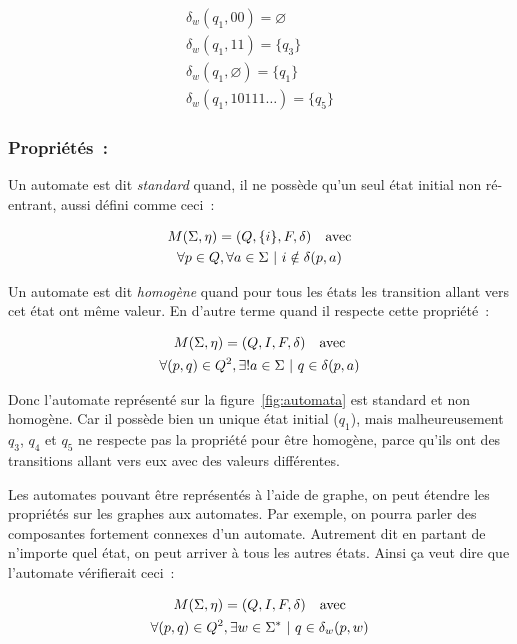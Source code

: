 \documentclass[12pt]{article}
\begin{document}
\begin{gather}
    \delta_w(q_1, 00) = \varnothing \\
    \delta_w(q_1, 11) = \{q_3\} \\
    \delta_w(q_1, \varnothing) = \{q_1\} \\
    \delta_w(q_1, 10111\dots) = \{q_5\}
\end{gather}

\subsubsection*{Propriétés~:}

Un automate est dit \textit{standard} quand, il ne possède qu'un seul état
initial non ré-entrant, aussi défini comme ceci~:

\begin{gather}
    M(\Sigma, \eta) = (Q, \{i\}, F, \delta) \quad \text{avec} \\
    \forall p \in Q, \forall a \in \Sigma ~|~ i \notin \delta(p, a) \notag
\end{gather}

Un automate est dit \textit{homogène} quand pour tous les états les transition
allant vers cet état ont même valeur. En d'autre terme quand il respecte cette
propriété~:

\begin{gather}
    M(\Sigma, \eta) = (Q, I, F, \delta) \quad \text{avec} \\
    \forall (p, q) \in Q^2, \exists! a \in \Sigma ~|~ q \in \delta(p, a) \notag
\end{gather}

Donc l'automate représenté sur la figure~\ref{fig:automata} est standard et non
homogène. Car il possède bien un unique état initial (\(q_1\)), mais
malheureusement \(q_3\), \(q_4\) et \(q_5\) ne respecte pas la propriété pour
être homogène, parce qu'ils ont des transitions allant vers eux avec des
valeurs différentes.

\vphantom{}

Les automates pouvant être représentés à l'aide de graphe, on peut étendre les
propriétés sur les graphes aux automates. Par exemple, on pourra parler des
composantes fortement connexes d'un automate. Autrement dit en partant de
n'importe quel état, on peut arriver à tous les autres états. Ainsi ça veut
dire que l'automate vérifierait ceci~:

\begin{gather}
    M(\Sigma, \eta) = (Q, I, F, \delta) \quad \text{avec} \\
    \forall (p, q) \in Q^2, \exists w \in \Sigma^* ~|~ q \in \delta_w(p, w) \notag
\end{gather}
\end{document}
